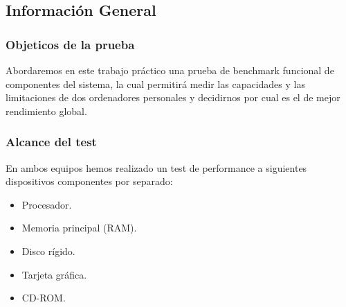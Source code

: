 \subsection{Información General}
\subsubsection{Objeticos de la prueba}
Abordaremos en este trabajo práctico una prueba de benchmark funcional de
componentes del sistema, la cual permitirá medir las capacidades y las
limitaciones de dos ordenadores personales y decidirnos por cual es el de mejor
rendimiento global.

\subsubsection{Alcance del test}
En ambos equipos hemos realizado un test de performance a siguientes
dispositivos componentes por separado:
\begin{itemize}
\item Procesador.
\item Memoria principal (RAM).
\item Disco rígido.
\item Tarjeta gráfica.
\item CD-ROM.
\end{itemize}